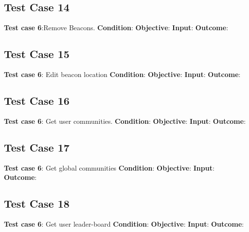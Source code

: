 \documentclass[11pt]{article}
\begin{document}
\subsection{Test Case 14}
\textbf{Test case 6}:Remove Beacons.  \newline
\textbf{Condition}:  \newline
\textbf{Objective}:   \newline
\textbf{Input}:  \newline
\textbf{Outcome}:   \newline

\subsection{Test Case 15}
\textbf{Test case 6}: Edit beacon location \newline
\textbf{Condition}:  \newline
\textbf{Objective}:   \newline
\textbf{Input}:  \newline
\textbf{Outcome}:   \newline

\subsection{Test Case 16}
\textbf{Test case 6}: Get user communities. \newline
\textbf{Condition}:  \newline
\textbf{Objective}:   \newline
\textbf{Input}:  \newline
\textbf{Outcome}:   \newline

\subsection{Test Case 17}
\textbf{Test case 6}: Get global communities \newline
\textbf{Condition}:  \newline
\textbf{Objective}:   \newline
\textbf{Input}:  \newline
\textbf{Outcome}:   \newline

\subsection{Test Case 18}
\textbf{Test case 6}: Get user leader-board \newline
\textbf{Condition}:  \newline
\textbf{Objective}:   \newline
\textbf{Input}:  \newline
\textbf{Outcome}:   \newline
\end{document}
